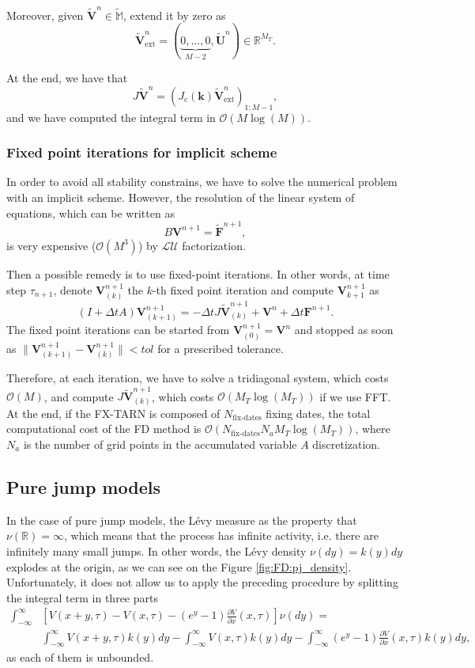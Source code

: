 Moreover, given $\mathbf{\tilde{V}}^n\in\mathbb{\tilde{M}}$, extend it by zero as
$$\mathbf{\tilde{V}}^n_{\text{ext}}=(\underbrace{0,\ldots,0}_{M-2},\mathbf{\tilde{U}}^n)\in \mathbb{R}^{M_T}.$$

At the end, we have that 
$$J\mathbf{\tilde{V}}^n = \left(J_c(\mathbf{k})\mathbf{\tilde{V}}^n_\text{ext}\right)_{1:M-1},$$
and we have computed the integral term in $\mathcal{O}(M\log(M))$.

\subsubsection{Fixed point iterations for implicit scheme}

In order to avoid all stability constrains, we have to solve the numerical problem with an implicit scheme. However, the resolution of the linear system of equations, which can be written as
$$B\mathbf{V}^{n+1}=\mathbf{\tilde{F}}^{n+1},$$
is very expensive ($\mathcal{O}(M^3)$) by $\mathcal{LU}$ factorization.

Then a possible remedy is to use fixed-point iterations. In other words, at time step $\tau_{n+1}$, denote $\mathbf{V}^{n+1}_{(k)}$ the $k$-th fixed point iteration and compute $\mathbf{V}^{n+1}_{k+1}$ as
$$(I+\Delta t A)\mathbf{V}^{n+1}_{(k+1)} = -\Delta t J\mathbf{\tilde{V}}^{n+1}_(k)+\mathbf{V}^n + \Delta t \mathbf{F}^{n+1}.$$
The fixed point iterations can be started from $\mathbf{V}^{n+1}_{(0)}=\mathbf{V}^n$ and stopped as soon as $\parallel\mathbf{V}^{n+1}_{(k+1)}-\mathbf{V}^{n+1}_{(k)}\parallel < tol$ for a prescribed tolerance.

Therefore, at each iteration, we have to solve a tridiagonal system, which costs $\mathcal{O}(M)$, and compute $J\mathbf{\tilde{V}}^{n+1}_{(k)}$, which costs $\mathcal{O}(M_T \log(M_T))$ if we use FFT. At the end, if the FX-TARN is composed of $N_\text{fix-dates}$ fixing dates, the total computational cost of the FD method is $\mathcal{O}(N_\text{fix-dates} N_a M_T\log(M_T))$, where $N_a$ is the number of grid points in the accumulated variable $A$ discretization.

\subsection{Pure jump models}
In the case of pure jump models, the L\'evy measure as the property that $\nu(\mathbb{R})= \infty$, which means that the process has infinite activity, i.e. there are infinitely many small jumps. In other words, the L\'evy density $\nu(dy)=k(y)dy$ explodes at the origin, as we can see on the Figure \ref{fig:FD:pj_density}. Unfortunately, it does not allow us to apply the preceding procedure by splitting the integral term in three parts
\begin{align*}
\int_{-\infty}^\infty &\left[V(x+y,\tau)-V(x,\tau)-\left(e^y-1\right)\frac{\partial V}{\partial x}(x,\tau)\right]\nu(dy) = \\
&\int_{-\infty}^\infty V(x+y,\tau)k(y) dy -\int_{-\infty}^\infty V(x,\tau)k(y)dy-\int_{-\infty}^\infty\left(e^y-1\right)\frac{\partial V}{\partial x}(x,\tau)k(y)dy,
\end{align*}
as each of them is unbounded.

